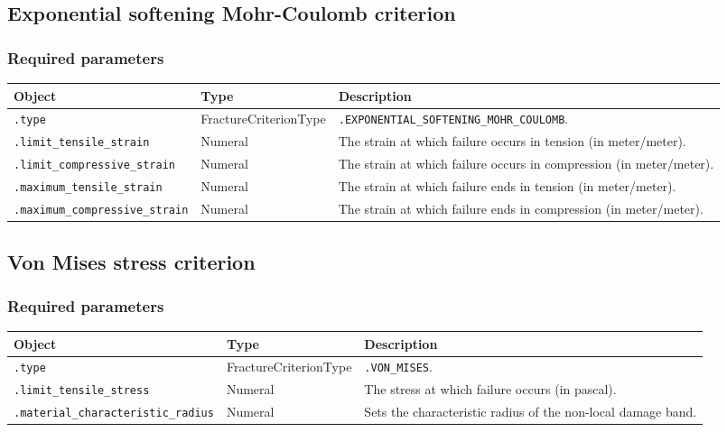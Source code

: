 \documentclass[10pt]{article}
\begin{document}
\subsection{Exponential softening Mohr-Coulomb criterion}

\subsubsection*{Required parameters}

\begin{tabularx}{\textwidth}{llX}
\hline 
Object & Type & Description \\ 
\hline 
\verb+.type+ & FractureCriterionType & \verb+.EXPONENTIAL_SOFTENING_MOHR_COULOMB+. \\ 
\verb+.limit_tensile_strain+ & Numeral & The strain at which failure occurs in tension (in meter/meter).\\
\verb+.limit_compressive_strain+ & Numeral & The strain at which failure occurs in compression (in meter/meter).\\
\verb+.maximum_tensile_strain+ & Numeral & The strain at which failure ends in tension (in meter/meter).\\
\verb+.maximum_compressive_strain+ & Numeral & The strain at which failure ends in compression (in meter/meter).\\
\hline 
\end{tabularx}

\subsection{Von Mises stress criterion}

\subsubsection*{Required parameters}

\begin{tabularx}{\textwidth}{llX}
\hline 
Object & Type & Description \\ 
\hline 
\verb+.type+ & FractureCriterionType & \verb+.VON_MISES+. \\ 
\verb+.limit_tensile_stress+ & Numeral & The stress at which failure occurs (in pascal).\\
\verb+.material_characteristic_radius+ & Numeral & Sets the characteristic radius of the non-local damage band. \\ 
\hline 
\end{tabularx}
\end{document}
